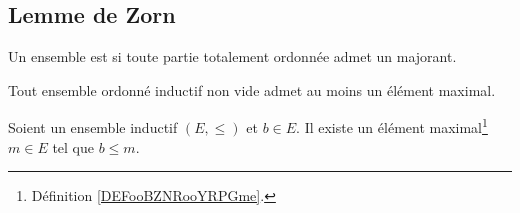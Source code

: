 \subsection{Lemme de Zorn}
\label{SUBooLemmeZorn}



\begin{definition}  \label{DefGHDfyyz}
	Un ensemble est  si toute partie totalement ordonnée admet un majorant.
\end{definition}


\begin{lemma}    \label{LemUEGjJBc}
	Tout ensemble ordonné inductif non vide admet au moins un élément maximal.
\end{lemma}

\begin{proposition}       \label{PROPooFOETooWYLOeq}
	Soient un ensemble inductif \( (E,\leq)\) et \( b\in E\). Il existe un élément maximal\footnote{Définition \ref{DEFooBZNRooYRPGme}.} \( m\in E\) tel que \( b\leq m\).
\end{proposition}

